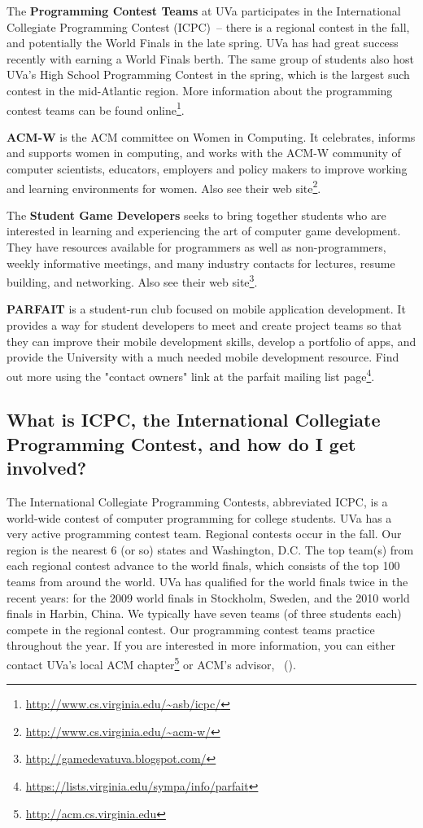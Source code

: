 \documentclass[10pt,letter,twocolumn]{book}
\newcommand{\myurl}[1]{\footnote{\scriptsize\url{#1}}}
\begin{document}
The {\bf Programming Contest Teams} at UVa participates in the
International Collegiate Programming Contest (ICPC)~-- there is a
regional contest in the fall, and potentially the World Finals in the
late spring.  UVa has had great success recently with earning a World
Finals berth.  The same group of students also host UVa's High School
Programming Contest in the spring, which is the largest such contest
in the mid-Atlantic region.  More information about the programming
contest teams can be found
online\myurl{http://www.cs.virginia.edu/~asb/icpc/}.

{\bf ACM-W} is the ACM committee on Women in Computing. It celebrates,
informs and supports women in computing, and works with the ACM-W
community of computer scientists, educators, employers and policy
makers to improve working and learning environments for women. Also
see their web site\myurl{http://www.cs.virginia.edu/~acm-w/}.

The {\bf Student Game Developers} seeks to bring together students who
are interested in learning and experiencing the art of computer game
development. They have resources available for programmers as well as
non-programmers, weekly informative meetings, and many industry
contacts for lectures, resume building, and networking. Also see their
web site\myurl{http://gamedevatuva.blogspot.com/}.

{\bf PARFAIT} is a student-run club focused on mobile application
development. It provides a way for student developers to meet and
create project teams so that they can improve their mobile development
skills, develop a portfolio of apps, and provide the University with a
much needed mobile development resource. Find out more using the "contact
owners" link at the parfait mailing list
page\myurl{https://lists.virginia.edu/sympa/info/parfait}.

\subsection{What is ICPC, the International Collegiate Programming
  Contest, and how do I get involved?}

The International Collegiate Programming Contests, abbreviated ICPC,
is a world-wide contest of computer programming for college
students. UVa has a very active programming contest team. Regional
contests occur in the fall.  Our region is the nearest 6 (or so)
states and Washington, D.C. The top team(s) from each regional contest
advance to the world finals, which consists of the top 100 teams from
around the world. UVa has qualified for the world finals twice in the
recent years: for the 2009 world finals in Stockholm, Sweden, and the
2010 world finals in Harbin, China. We typically have seven teams (of
three students each) compete in the regional contest. Our programming
contest teams practice throughout the year. If you are interested in
more information, you can either contact UVa's local ACM
chapter\myurl{http://acm.cs.virginia.edu} or ACM's advisor,
\acmadvisor\ (\acmadvisoremail).
\end{document}
